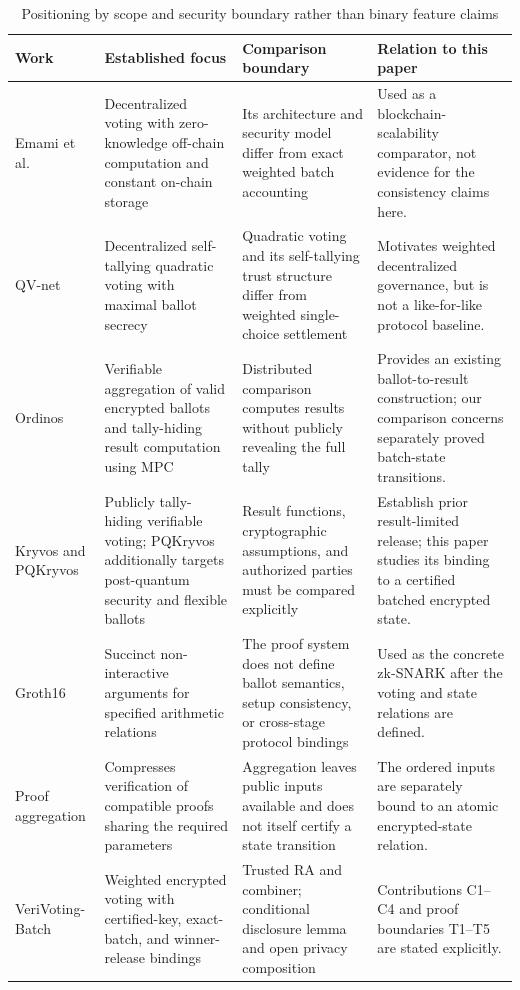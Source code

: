 \documentclass[pdflatex,sn-mathphys-num]{sn-jnl}%
\theoremstyle{thmstyleone}%
\theoremstyle{thmstyletwo}%
\theoremstyle{thmstylethree}%
\begin{document}
\begin{table}[htbp]
\centering
\caption{Positioning by scope and security boundary rather than binary feature claims}
\label{tab:related-positioning}
\small
\begin{tabular}{p{}p{}p{}p{}}
\toprule
Work & Established focus & Comparison boundary & Relation to this paper \\
\midrule
Emami et al. \cite{bib138} & Decentralized voting with zero-knowledge off-chain computation and constant on-chain storage & Its architecture and security model differ from exact weighted batch accounting & Used as a blockchain-scalability comparator, not evidence for the consistency claims here. \\
QV-net \cite{bib137} & Decentralized self-tallying quadratic voting with maximal ballot secrecy & Quadratic voting and its self-tallying trust structure differ from weighted single-choice settlement & Motivates weighted decentralized governance, but is not a like-for-like protocol baseline. \\
Ordinos \cite{bib76} & Verifiable aggregation of valid encrypted ballots and tally-hiding result computation using MPC & Distributed comparison computes results without publicly revealing the full tally & Provides an existing ballot-to-result construction; our comparison concerns separately proved batch-state transitions. \\
Kryvos and PQKryvos \cite{bib77,bib139} & Publicly tally-hiding verifiable voting; PQKryvos additionally targets post-quantum security and flexible ballots & Result functions, cryptographic assumptions, and authorized parties must be compared explicitly & Establish prior result-limited release; this paper studies its binding to a certified batched encrypted state. \\
Groth16 \cite{bib32} & Succinct non-interactive arguments for specified arithmetic relations & The proof system does not define ballot semantics, setup consistency, or cross-stage protocol bindings & Used as the concrete zk-SNARK after the voting and state relations are defined. \\
Proof aggregation \cite{bib128,bib129} & Compresses verification of compatible proofs sharing the required parameters & Aggregation leaves public inputs available and does not itself certify a state transition & The ordered inputs are separately bound to an atomic encrypted-state relation. \\
VeriVoting-Batch & Weighted encrypted voting with certified-key, exact-batch, and winner-release bindings & Trusted RA and combiner; conditional disclosure lemma and open privacy composition & Contributions C1--C4 and proof boundaries T1--T5 are stated explicitly. \\
\bottomrule
\end{tabular}
\end{table}
\end{document}
